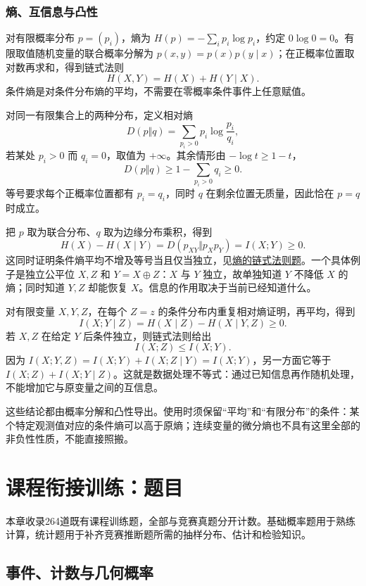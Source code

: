 \documentclass[UTF8,12pt,a4paper,fontset=fandol]{ctexbook}
\begin{document}
\subsection{熵、互信息与凸性}

\label{app:probability-entropy}

对有限概率分布 $p=(p_i)$，熵为 $H(p)=-\sum_i p_i\log p_i$，约定 $0\log0=0$。有限取值随机变量的联合概率分解为 $p(x,y)=p(x)p(y\mid x)$；在正概率位置取对数再求和，得到链式法则
\[
H(X,Y)=H(X)+H(Y\mid X).
\]
条件熵是对条件分布熵的平均，不需要在零概率条件事件上任意赋值。

对同一有限集合上的两种分布，定义相对熵
\[
D(p\Vert q)=\sum_{p_i>0}p_i\log\frac{p_i}{q_i},
\]
若某处 $p_i>0$ 而 $q_i=0$，取值为 $+\infty$。其余情形由 $-\log t\ge1-t$，
\[
D(p\Vert q)\ge1-\sum_{p_i>0}q_i\ge0.
\]
等号要求每个正概率位置都有 $p_i=q_i$，同时 $q$ 在剩余位置无质量，因此恰在 $p=q$ 时成立。

把 $p$ 取为联合分布、$q$ 取为边缘分布乘积，得到
\[
H(X)-H(X\mid Y)
=D(p_{XY}\Vert p_Xp_Y)=I(X;Y)\ge0.
\]
这同时证明条件熵平均不增及等号当且仅当独立，见\hyperref[pr:fin17-high:12]{熵的链式法则题}。一个具体例子是独立公平位 $X,Z$ 和 $Y=X\mathbin{\oplus}Z$：$X$ 与 $Y$ 独立，故单独知道 $Y$ 不降低 $X$ 的熵；同时知道 $Y,Z$ 却能恢复 $X$。信息的作用取决于当前已经知道什么。

对有限变量 $X,Y,Z$，在每个 $Z=z$ 的条件分布内重复相对熵证明，再平均，得到
\[
I(X;Y\mid Z)=H(X\mid Z)-H(X\mid Y,Z)\ge0.
\]
若 $X,Z$ 在给定 $Y$ 后条件独立，则链式法则给出
\[
I(X;Z)\le I(X;Y).
\]
因为 $I(X;Y,Z)=I(X;Y)+I(X;Z\mid Y)=I(X;Y)$，另一方面它等于 $I(X;Z)+I(X;Y\mid Z)$。这就是数据处理不等式：通过已知信息再作随机处理，不能增加它与原变量之间的互信息。

这些结论都由概率分解和凸性导出。使用时须保留“平均”和“有限分布”的条件：某个特定观测值对应的条件熵可以高于原熵；连续变量的微分熵也不具有这里全部的非负性性质，不能直接照搬。

\chapter{课程衔接训练：题目}
本章收录264道既有课程训练题，全部与竞赛真题分开计数。基础概率题用于熟练计算，统计题用于补齐竞赛推断题所需的抽样分布、估计和检验知识。


\clearpage\section{事件、计数与几何概率}
\end{document}
